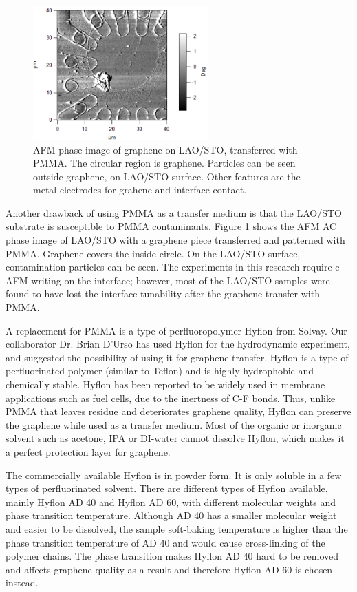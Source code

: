 \documentclass[pdflatex, sectionletters, 12pt, final, phd]{pittetd}    %
\begin{document}
\begin{figure}[h!]
	\centering
	\includegraphics[width=0.60\textwidth]{Drawing/PMMAResidue.png}
	\caption[AFM phase image of graphene on LAO/STO]{AFM phase image of graphene on LAO/STO, transferred with PMMA. The circular region is graphene. Particles can be seen outside graphene, on LAO/STO surface. Other features are the metal electrodes for grahene and interface contact.}
	\label{FIG:PMMAResidue}
\end{figure}

Another drawback of using PMMA as a transfer medium is that the LAO/STO substrate is susceptible to PMMA contaminants. Figure \ref{FIG:PMMAResidue} shows the AFM AC phase image of  LAO/STO with a graphene piece transferred and patterned with PMMA. Graphene covers the inside circle. On the LAO/STO surface, contamination particles can be seen. The experiments in this research require c-AFM writing on the interface; however, most of the LAO/STO samples were found to have lost the interface tunability after the graphene transfer with PMMA\cite{li2016method}. 

A replacement for PMMA is a type of perfluoropolymer Hyflon from Solvay. Our collaborator Dr. Brian D'Urso has used Hyflon for the hydrodynamic experiment, and suggested the possibility of using it for graphene transfer. Hyflon is a type of perfluorinated polymer (similar to Teflon) and is highly hydrophobic and chemically stable. Hyflon has been reported to be widely used in membrane applications such as fuel cells, due to the inertness of C-F bonds\cite{arcella2005hyflon, merlo2007membrane, zhang2012recent}. Thus, unlike PMMA that leaves residue and deteriorates graphene quality, Hyflon can preserve the graphene while used as a transfer medium. Most of the organic or inorganic solvent such as acetone, IPA or DI-water cannot dissolve Hyflon, which makes it a perfect protection layer for graphene. 

The commercially available Hyflon is in powder form. It is only soluble in a few types of perfluorinated solvent. There are different types of Hyflon available, mainly Hyflon AD 40 and Hyflon AD 60, with different molecular weights and phase transition temperature. Although AD 40 has a smaller molecular weight and easier to be dissolved, the sample soft-baking temperature is higher than the phase transition temperature of AD 40 and would cause cross-linking of the polymer chains. The phase transition makes Hyflon AD 40 hard to be removed and affects graphene quality as a result and therefore Hyflon AD 60 is chosen instead.
\end{document}
